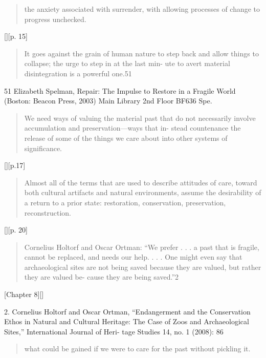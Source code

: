 \begin{quotation}
    the anxiety associated with surrender, with allowing processes of change to
    progress unchecked.
\end{quotation}[][p. 15]

\begin{quotation}
    It goes against the grain of human nature to step back and allow things to
    collapse; the urge to step in at the last min- ute to avert material
    disintegration is a powerful one.51
\end{quotation}

51 Elizabeth Spelman, Repair: The Impulse to Restore in a Fragile World (Boston:
Beacon Press, 2003) Main Library 2nd Floor BF636 Spe.

\begin{quotation}
    We need ways of valuing the material past that do not necessarily involve
    accumulation and preservation—ways that in- stead countenance the release of
    some of the things we care about into other systems of significance.
\end{quotation}[][p.17]

\begin{quotation}
    Almost all of the terms that are used to describe attitudes of care, toward
    both cultural artifacts and natural environments, assume the desirability of
    a return to a prior state: restoration, conservation, preservation,
    reconstruction. 
\end{quotation}[][p. 20]

\begin{quotation}
    Cornelius Holtorf and Oscar Ortman: “We prefer . . . a past that is fragile,
cannot be replaced, and needs our help. . . . One might even say that
archaeological sites are not being saved because they are valued, but rather
they are valued be- cause they are being saved.”2
\end{quotation}[Chapter 8][]

2. Cornelius Holtorf and Oscar Ortman, “Endangerment and the Conservation Ethos
in Natural and Cultural Heritage: The Case of Zoos and Archaeological Sites,”
International Journal of Heri- tage Studies 14, no. 1 (2008): 86

\begin{quotation}
    what could be gained if we were to care for the past without pickling it.
\end{quotation}

\subsection{\cite{holzer_imperfect_2025}}

